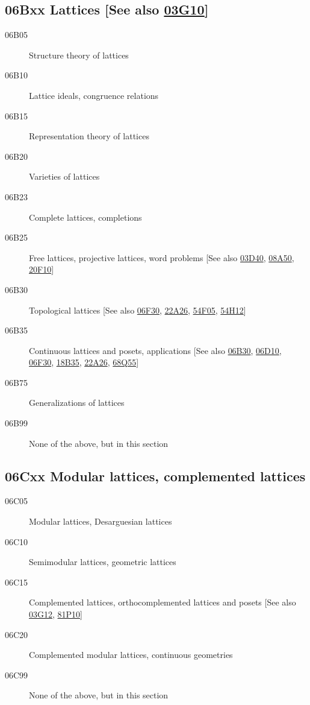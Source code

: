 \documentclass[letterpaper]{article}
\begin{document}
\subsection*{06Bxx  Lattices [See also \hyperref[03G10]{03G10}] }\label{06Bxx}
\begin{description}  
\item [06B05]\label{06B05} Structure theory of lattices
\item [06B10]\label{06B10} Lattice ideals, congruence relations
\item [06B15]\label{06B15} Representation theory of lattices
\item [06B20]\label{06B20} Varieties of lattices
\item [06B23]\label{06B23} Complete lattices, completions
\item [06B25]\label{06B25} Free lattices, projective lattices, word problems [See also \hyperref[03D40]{03D40}, \hyperref[08A50]{08A50}, \hyperref[20F10]{20F10}]
\item [06B30]\label{06B30} Topological lattices [See also \hyperref[06F30]{06F30}, \hyperref[22A26]{22A26}, \hyperref[54F05]{54F05}, \hyperref[54H12]{54H12}]
\item [06B35]\label{06B35} Continuous lattices and posets, applications [See also \hyperref[06B30]{06B30}, \hyperref[06D10]{06D10}, \hyperref[06F30]{06F30}, \hyperref[18B35]{18B35}, \hyperref[22A26]{22A26}, \hyperref[68Q55]{68Q55}]
\item [06B75]\label{06B75} Generalizations of lattices
\item [06B99]\label{06B99} None of the above, but in this section
\end{description}
\subsection*{06Cxx  Modular lattices, complemented lattices }\label{06Cxx}
\begin{description}  
\item [06C05]\label{06C05} Modular lattices, Desarguesian lattices
\item [06C10]\label{06C10} Semimodular lattices, geometric lattices
\item [06C15]\label{06C15} Complemented lattices, orthocomplemented lattices and posets [See also \hyperref[03G12]{03G12}, \hyperref[81P10]{81P10}]
\item [06C20]\label{06C20} Complemented modular lattices, continuous geometries
\item [06C99]\label{06C99} None of the above, but in this section
\end{description}
\end{document}
